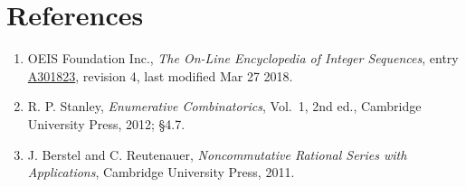 \documentclass[11pt]{article}
\theoremstyle{definition}
\begin{document}
\section{References}

\begin{enumerate}

\item OEIS Foundation Inc., \emph{The On-Line Encyclopedia of Integer Sequences}, entry \href{https://oeis.org/A301823}{A301823}, revision 4, last modified Mar 27 2018.

\item R. P. Stanley, \emph{Enumerative Combinatorics}, Vol.~1, 2nd ed., Cambridge University Press, 2012; \S4.7.

\item J. Berstel and C. Reutenauer, \emph{Noncommutative Rational Series with Applications}, Cambridge University Press, 2011.

\end{enumerate}
\end{document}
